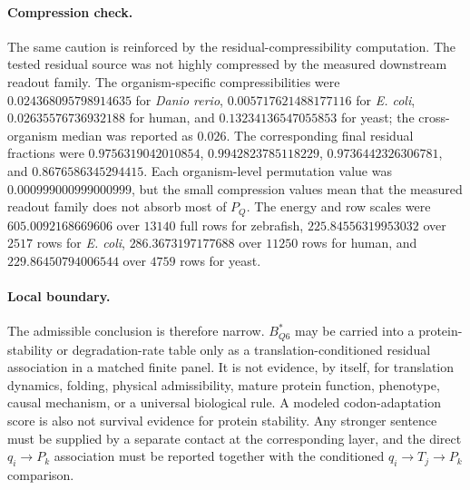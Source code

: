 \paragraph{Compression check.}
The same caution is reinforced by the residual-compressibility computation.  The tested residual source was not highly compressed by the measured downstream readout family.  The organism-specific compressibilities were $0.024368095798914635$ for \emph{Danio rerio}, $0.005717621488177116$ for \emph{E. coli}, $0.02635576736932188$ for human, and $0.13234136547055853$ for yeast; the cross-organism median was reported as $0.026$.  The corresponding final residual fractions were $0.9756319042010854$, $0.9942823785118229$, $0.9736442326306781$, and $0.8676586345294415$.  Each organism-level permutation value was $0.000999000999000999$, but the small compression values mean that the measured readout family does not absorb most of $P_Q$.  The energy and row scales were $605.0092168669606$ over $13140$ full rows for zebrafish, $225.84556319953032$ over $2517$ rows for \emph{E. coli}, $286.3673197177688$ over $11250$ rows for human, and $229.86450794006544$ over $4759$ rows for yeast.

\paragraph{Local boundary.}
The admissible conclusion is therefore narrow.  $B^{*}_{Q6}$ may be carried into a protein-stability or degradation-rate table only as a translation-conditioned residual association in a matched finite panel.  It is not evidence, by itself, for translation dynamics, folding, physical admissibility, mature protein function, phenotype, causal mechanism, or a universal biological rule.  A modeled codon-adaptation score is also not survival evidence for protein stability.  Any stronger sentence must be supplied by a separate contact at the corresponding layer, and the direct $q_i \to P_k$ association must be reported together with the conditioned $q_i \to T_j \to P_k$ comparison.

